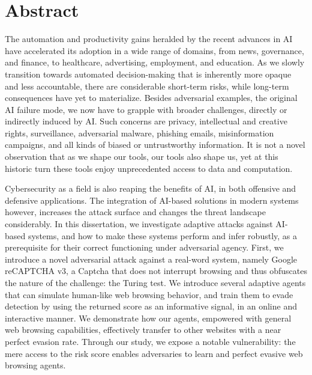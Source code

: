 \chapter{Abstract}
\label{ch:abstract}

The automation and productivity gains heralded by the recent advances in \gls{AI} have accelerated its adoption in a wide range of domains, from news, governance, and finance, to healthcare, advertising, employment, and education.
As we slowly transition towards automated decision-making that is inherently more opaque and less accountable, there are considerable short-term risks, while long-term consequences have yet to materialize.
Besides adversarial examples, the original \gls{AI} failure mode, we now have to grapple with broader challenges, directly or indirectly induced by \gls{AI}.
Such concerns are privacy, intellectual and creative rights, surveillance, adversarial malware, phishing emails, misinformation campaigns, and all kinds of biased or untrustworthy information.
It is not a novel observation that as we shape our tools, our tools also shape us, yet at this historic turn these tools enjoy unprecedented access to data and computation.

Cybersecurity as a field is also reaping the benefits of \gls{AI}, in both offensive and defensive applications.
The integration of AI-based solutions in modern systems however, increases the attack surface and changes the threat landscape considerably.
In this dissertation, we investigate adaptive attacks against AI-based systems, and how to make these systems perform and infer robustly, as a prerequisite for their correct functioning under adversarial agency.
First, we introduce a novel adversarial attack against a real-word system, namely Google reCAPTCHA v3, a Captcha that does not interrupt browsing and thus obfuscates the nature of the challenge: the Turing test.
We introduce several adaptive agents that can simulate human-like web browsing behavior, and train them to evade detection by using the returned score as an informative signal, in an online and interactive manner.
We demonstrate how our agents, empowered with general web browsing capabilities, effectively transfer to other websites with a near perfect evasion rate.
Through our study, we expose a notable vulnerability: the mere access to the risk score enables adversaries to learn and perfect evasive web browsing agents.

